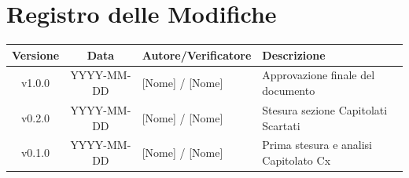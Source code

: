 \section*{Registro delle Modifiche}
\begin{table}[ht]
	\centering
	\renewcommand{\arraystretch}{1.5}
	\begin{tabularx}{\textwidth}{c c l X}
		\toprule
		\textbf{Versione} & \textbf{Data} & \textbf{Autore/Verificatore} & \textbf{Descrizione} \\
		\midrule
		v1.0.0 & YYYY-MM-DD & {[Nome] / [Nome]} & Approvazione finale del documento \\
		v0.2.0 & YYYY-MM-DD & {[Nome] / [Nome]} & Stesura sezione Capitolati Scartati \\
		v0.1.0 & YYYY-MM-DD & {[Nome] / [Nome]} & Prima stesura e analisi Capitolato Cx \\
		\bottomrule
	\end{tabularx}
\end{table}
